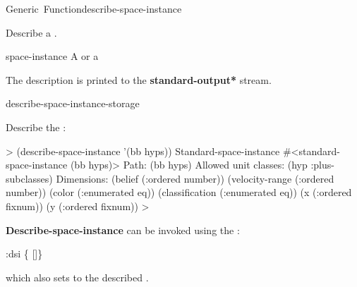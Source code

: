 \documentclass[10pt,twoside,english,pdftex]{article}
\begin{document}

\begin{functiondoc}{Generic~Function}{describe-space-instance}%
  {}
%
%

\fnsyntax

\fnpurpose Describe a .

\fnmethods
{}%
  {\code{(} }
%
  {\code{(} }

\fnpackage {}

\fnmodule {}

\fnargs
\begin{args}{space-instance}
 A  or a 
\end{args}

\fndescription
{}%
The description is printed to the {\bf *standard-output*} stream.

\begin{alsos}{describe-space-instance-storage}
\end{alsos}

\fnexample
Describe the  :
%
\W\supp
\begin{example}
  > (describe-space-instance '(bb hyps))
    Standard-space-instance #<standard-space-instance (bb hyps)>
      Path: (bb hyps)
      Allowed unit classes:
        (hyp :plus-subclasses)
      Dimensions:
        (belief (:ordered number))
        (velocity-range (:ordered number))
        (color (:enumerated eq))
        (classification (:enumerated eq))
        (x (:ordered fixnum))
        (y (:ordered fixnum))
  >
\end{example}

\replnote 
%
%
%
\textbf{Describe-space-instance} can be invoked using the :
%
\W\supp
\begin{example}
  :dsi  \vbar \{ \textrm{[}\textrm{]}\}
\end{example}
%
which also sets \code{=} to the described .

\end{functiondoc}
\end{document}
